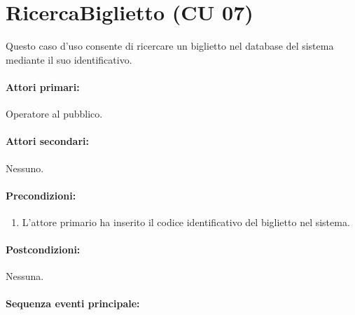 \documentclass{article}
\begin{document}
\pagebreak 

		\section*{RicercaBiglietto (CU 07)}
	
	\indent\indent Questo caso d'uso consente di ricercare un biglietto nel database del sistema mediante il suo identificativo.
	
	\paragraph{Attori primari:}Operatore al pubblico.
	
	\paragraph{Attori secondari:}Nessuno.
	
	\paragraph{Precondizioni:}
			\begin{enumerate}	[itemsep=8pt,parsep=0pt]
				\item L'attore primario ha inserito il codice identificativo del biglietto nel sistema.
  			\end{enumerate}	
	
	\paragraph{Postcondizioni:}Nessuna.
	
	\paragraph{Sequenza eventi principale:}
\end{document}
